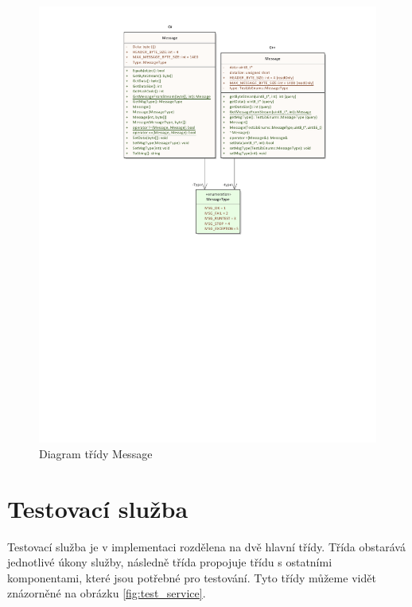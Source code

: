 \begin{figure}[p!]
    \centering 
    \includegraphics[width=\textwidth]{assets/img/class_diagram/message.pdf}
    \caption{Diagram třídy Message}
    \label{fig:message_class}
\end{figure}

\clearpage

\section{Testovací služba}
Testovací služba je v implementaci rozdělena na dvě hlavní třídy. Třída  obstarává jednotlivé úkony služby, následně třída  propojuje třídu  s ostatními komponentami, které jsou potřebné pro testování. Tyto třídy můžeme vidět znázorněné na obrázku \ref{fig:test_service}.

